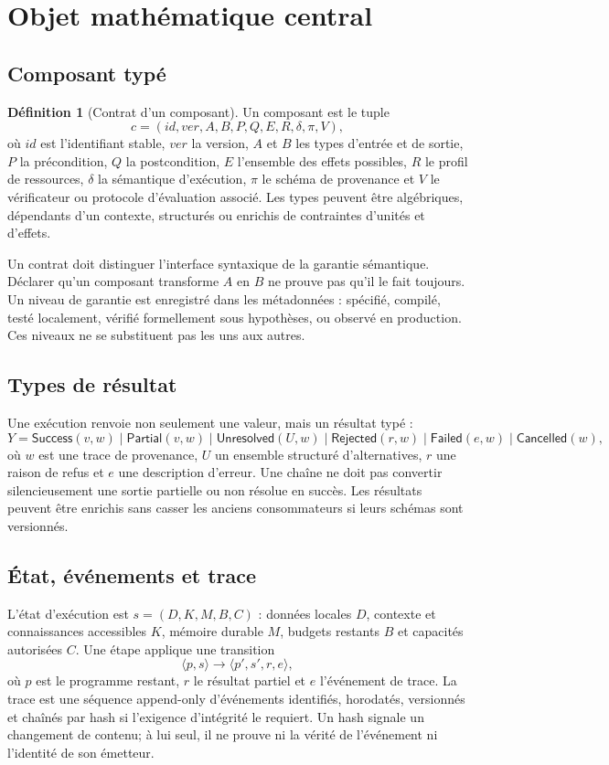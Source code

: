 \documentclass[11pt,a4paper]{article}
\theoremstyle{definition}
\newtheorem{definition}{Définition}[section]
\theoremstyle{plain}
\theoremstyle{remark}
\begin{document}
\section{Objet mathématique central}
\subsection{Composant typé}
\begin{definition}[Contrat d'un composant]
Un composant est le tuple
\[
c=(id,ver,A,B,P,Q,E,R,\delta,\pi,V),
\]
où $id$ est l'identifiant stable, $ver$ la version, $A$ et $B$ les types d'entrée et de sortie, $P$ la précondition, $Q$ la postcondition, $E$ l'ensemble des effets possibles, $R$ le profil de ressources, $\delta$ la sémantique d'exécution, $\pi$ le schéma de provenance et $V$ le vérificateur ou protocole d'évaluation associé. Les types peuvent être algébriques, dépendants d'un contexte, structurés ou enrichis de contraintes d'unités et d'effets.
\end{definition}

Un contrat doit distinguer l'interface syntaxique de la garantie sémantique. Déclarer qu'un composant transforme $A$ en $B$ ne prouve pas qu'il le fait toujours. Un niveau de garantie est enregistré dans les métadonnées : spécifié, compilé, testé localement, vérifié formellement sous hypothèses, ou observé en production. Ces niveaux ne se substituent pas les uns aux autres.

\subsection{Types de résultat}
Une exécution renvoie non seulement une valeur, mais un résultat typé :
\[
Y = \mathsf{Success}(v,w) \mid \mathsf{Partial}(v,w) \mid \mathsf{Unresolved}(U,w)
\mid \mathsf{Rejected}(r,w) \mid \mathsf{Failed}(e,w) \mid \mathsf{Cancelled}(w),
\]
où $w$ est une trace de provenance, $U$ un ensemble structuré d'alternatives, $r$ une raison de refus et $e$ une description d'erreur. Une chaîne ne doit pas convertir silencieusement une sortie partielle ou non résolue en succès. Les résultats peuvent être enrichis sans casser les anciens consommateurs si leurs schémas sont versionnés.

\subsection{État, événements et trace}
L'état d'exécution est $s=(D,K,M,B,C)$ : données locales $D$, contexte et connaissances accessibles $K$, mémoire durable $M$, budgets restants $B$ et capacités autorisées $C$. Une étape applique une transition
\[
\langle p,s\rangle \longrightarrow \langle p',s',r,e\rangle,
\]
où $p$ est le programme restant, $r$ le résultat partiel et $e$ l'événement de trace. La trace est une séquence append-only d'événements identifiés, horodatés, versionnés et chaînés par hash si l'exigence d'intégrité le requiert. Un hash signale un changement de contenu; à lui seul, il ne prouve ni la vérité de l'événement ni l'identité de son émetteur.
\end{document}
